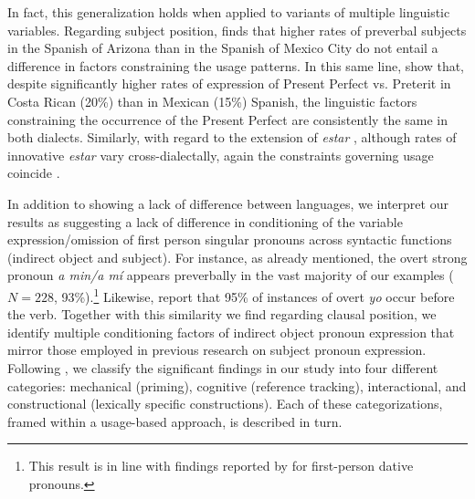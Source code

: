 \documentclass[output=paper]{langscibook}
\begin{document}
In fact, this generalization holds when applied to variants of multiple linguistic variables. Regarding subject position, \citet{Llompart2016} finds that higher rates of preverbal subjects in the Spanish of Arizona than in the Spanish of Mexico City do not entail a difference in factors constraining the usage patterns. In this same line, \citet{RivasPineda2022} show that, despite significantly higher rates of expression of Present Perfect vs. Preterit in Costa Rican (20\%) than in Mexican (15\%) Spanish, the linguistic factors constraining the occurrence of the Present Perfect are consistently the same in both dialects. Similarly, with regard to the extension of \textit{estar} \citep{Silva-Corvalán1986}, although rates of innovative \textit{estar} vary cross-dialectally, again the constraints governing usage coincide \citep{Rivas2022}.

In addition to showing a lack of difference between languages, we interpret our results as suggesting a lack of difference in conditioning of the variable expression/omission of first person singular pronouns across syntactic functions (indirect object and subject). For instance, as already mentioned, the overt strong pronoun \textit{a min\slash a mí} appears preverbally in the vast majority of our examples ($N = 228$, 93\%).\footnote{This result is in line with findings reported by \citet[106]{AijónOliva2019} for first-person dative pronouns.} Likewise, \citet[713]{TravisCacoullos2012} report that 95\% of instances of overt \textit{yo} occur before the verb. Together with this similarity we find regarding clausal position, we identify multiple conditioning factors of indirect object pronoun expression that mirror those employed in previous research on subject pronoun expression. Following \citet{TravisCacoullos2012}, we classify the significant findings in our study into four different categories: mechanical (priming), cognitive (reference tracking), interactional, and constructional (lexically specific constructions). Each of these categorizations, framed within a usage-based approach, is described in turn. 
\end{document}
